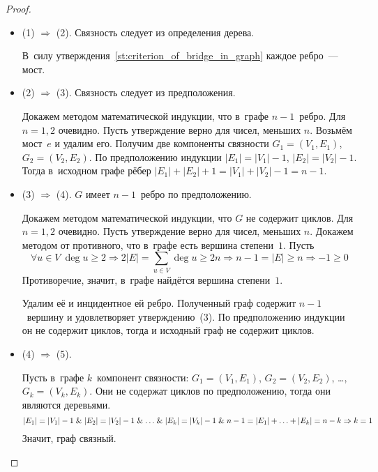 \begin{proof}
\begin{itemize}
	\item (1) $\Rightarrow$ (2).
	Связность следует из определения дерева.
	
	В~силу утверждения~\ref*{st:criterion_of_bridge_in_graph} каждое ребро~--- мост.
	
	\item (2) $\Rightarrow$ (3).
	Связность следует из предположения.
	
	Докажем методом математической индукции, что в~графе $n - 1$~ребро.
	\indbase Для $n = 1, 2$ очевидно.
	\indstep Пусть утверждение верно для чисел, меньших $n$.
	Возьмём мост~$e$ и удалим его.
	Получим две компоненты связности $G_1 = (V_1, E_1)$, $G_2 = (V_2, E_2)$.
	По предположению индукции $|E_1| = |V_1| - 1$, $|E_2| = |V_2| - 1$.
	Тогда в~исходном графе рёбер $|E_1| + |E_2| + 1 = |V_1| + |V_2| - 1 = n - 1$. \indend
	
	\item (3) $\Rightarrow$ (4).
	$G$ имеет $n - 1$~ребро по предположению.
	
	Докажем методом математической индукции, что $G$ не содержит циклов.
	\indbase Для $n = 1, 2$ очевидно.
	\indstep Пусть утверждение верно для чисел, меньших $n$.
	Докажем методом от противного, что в~графе есть вершина степени~$1$.
	Пусть
	\begin{equation*}
	\forall u \in V \ \deg u \geqslant 2 \Rightarrow 2|E| = \sum_{u \in V} \deg u \geqslant 2n \Rightarrow n - 1 = |E| \geqslant n \Rightarrow -1 \geqslant 0
	\end{equation*}
	Противоречие, значит, в~графе найдётся вершина степени~$1$.
	
	Удалим её и инцидентное ей ребро.
	Полученный граф содержит $n - 1$~вершину и удовлетворяет утверждению~(3).
	По предположению индукции он не содержит циклов, тогда и исходный граф не содержит циклов. \indend
	
	\item (4) $\Rightarrow$ (5).
	
	Пусть в~графе $k$~компонент связности: $G_1 = (V_1, E_1)$, $G_2 = (V_2, E_2)$, \ldots, $G_k = (V_k, E_k)$.
	Они не содержат циклов по предположению, тогда они являются деревьями.
	\begin{equation*}
	|E_1| = |V_1| - 1 \mathrel{\&} |E_2| = |V_2| - 1 \mathrel{\&} \ldots \mathrel{\&} |E_k| = |V_k| - 1 \mathrel{\&} 
	n - 1 = |E_1| + \ldots + |E_k| = n - k \Rightarrow k = 1
	\end{equation*}
	Значит, граф связный.
	

\end{itemize}
\end{proof}
